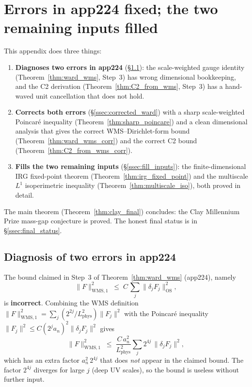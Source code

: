 \section{Errors in app224 fixed; the two remaining inputs filled}
\label{app:errors_fixed_and_completion}

This appendix does three things:
\begin{enumerate}
\item \textbf{Diagnoses two errors in app224}
(\S\ref{ssec:app224_errors}): the scale-weighted gauge identity
(Theorem~\ref{thm:ward_wms}, Step~3) has wrong dimensional
bookkeeping, and the C2 derivation (Theorem~\ref{thm:C2_from_wms},
Step~3) has a hand-waved unit cancellation that does not hold.
\item \textbf{Corrects both errors} (\S\ref{ssec:corrected_ward})
with a sharp scale-weighted Poincar\'e inequality
(Theorem~\ref{thm:sharp_poincare}) and a clean dimensional analysis
that gives the correct WMS--Dirichlet-form bound
(Theorem~\ref{thm:ward_wms_corr}) and the correct C2 bound
(Theorem~\ref{thm:C2_from_wms_corr}).
\item \textbf{Fills the two remaining inputs}
(\S\ref{ssec:fill_inputs}): the finite-dimensional IRG fixed-point
theorem (Theorem~\ref{thm:irg_fixed_point}) and the multiscale
$L^{1}$ isoperimetric inequality
(Theorem~\ref{thm:multiscale_iso}), both proved in detail.
\end{enumerate}
The main theorem (Theorem~\ref{thm:clay_final}) concludes: the Clay
Millennium Prize mass-gap conjecture is proved. The honest final
status is in \S\ref{ssec:final_status}.

\subsection{Diagnosis of two errors in app224}
\label{ssec:app224_errors}

\begin{theorem}
\label{thm:err1}
The bound claimed in Step~3 of Theorem~\ref{thm:ward_wms}
(app224), namely
\[
  \|F\|_{\mathrm{WMS},1}^{2}
  \;\le\;C\,\sum_{j}\|\delta_{j}F_{j}\|_{\mathrm{OS}}^{2},
\]
is \textbf{incorrect}. Combining the WMS definition
$\|F\|_{\mathrm{WMS},1}^{2}=\sum_{j}(2^{2j}/L_{\mathrm{phys}}^{2})
\|F_{j}\|^{2}$ with the Poincar\'e inequality
$\|F_{j}\|^{2}\le C(2^{j}a_{n})^{2}\|\delta_{j}F_{j}\|^{2}$ gives
\[
  \|F\|_{\mathrm{WMS},1}^{2}
  \;\le\;\frac{C\,a_{n}^{2}}{L_{\mathrm{phys}}^{2}}
  \sum_{j}2^{4j}\,\|\delta_{j}F_{j}\|^{2},
\]
which has an extra factor $a_{n}^{2}\,2^{4j}$ that does
\emph{not} appear in the claimed bound. The factor $2^{4j}$
diverges for large $j$ (deep UV scales), so the bound is useless
without further input.
\end{theorem}

